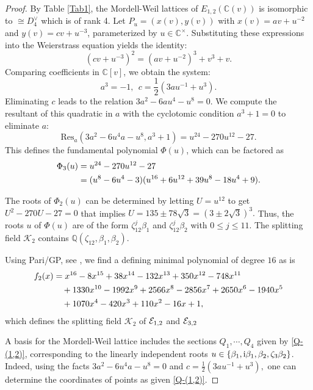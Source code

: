 \documentclass[11pt]{amsart}
\begin{document}
\begin{proof}
By Table \ref{Tab1}, the   Mordell-Weil lattices of  $E_{1,2}(\mathbb{C}(v)) $ is isomorphic to $\cong D_4^\vee$ which is of rank 4.
Let  $P_u = (x(v), y(v))$ with $x(v) = a v + u^{-2}$ and $y(v) = c v + u^{-3}$, parameterized by $u \in \mathbb{C}^\times$. Substituting these expressions into the Weierstrass equation yields the identity:
	\[ (c v + u^{-3})^2 = (a v + u^{-2})^3 + v^3 + v. \]
	Comparing coefficients in $\mathbb{C}[v]$, we obtain the system:
	\begin{equation*}
		a^3  = -1,   \ \ 
		c = \frac{1}{2}(3au^{-1} + u^3).
	\end{equation*}
	Eliminating $c$ leads to the relation $3a^2 - 6au^4 - u^8 = 0$. We compute the resultant of this quadratic in $a$ with the cyclotomic condition $a^3+1=0$ to eliminate $a$:
	\[ \mathrm{Res}_a(3a^2 - 6u^4 a - u^8, a^3+1) = u^{24} - 270u^{12} - 27. \]
	This defines the fundamental polynomial $\Phi(u)$, which can be factored as
	\begin{align}
		\Phi_3(u)  & =u^{24} - 270u^{12} - 27\notag \\
		& = (u^8 - 6u^4 - 3)(u^{16} + 6u^{12} + 39u^8 - 18u^4 + 9).
	\end{align} 
	
	

	The roots of $\Phi_2(u)$ can be determined by letting $U = u^{12}$ to get
	$ U^2 - 270 U - 27 = 0$ that  implies $U = 135 \pm 78\sqrt{3} = (3 \pm 2\sqrt{3})^3. $  Thus, 
	the roots $u$  of $\Phi(u)$ are of the form $\zeta_{12}^j \beta_1 $ and $ \zeta_{12}^j \beta_2  $ with  $0 \leq j \leq 11$.  The splitting field  $\mathcal{K}_2$ contains $ \mathbb{Q}(\zeta_{12}, \beta_1, \beta_2)$.
	
		Using Pari/GP, see \cite[Gp360]{Shioda360-Codes}, we find a defining minimal polynomial of degree $16$ as 
is
	\begin{align}
		f_2(x)	& = x^{16} - 8x^{15} + 38x^{14} - 132x^{13} + 350x^{12} - 748x^{11} \notag \\
		&\quad + 1330x^{10} - 1992x^9 + 2566x^8 - 2856x^7 + 2650x^6 - 1940x^5 \notag \\
		&\quad + 1070x^4 - 420x^3 + 110x^2 - 16x + 1,
		\label{f-(1,2)}
	\end{align} 
	which defines   the splitting field  $\mathcal{K}_2$ of   ${\mathcal E}_{1,2}$ and ${\mathcal E}_{3,2}$
	
 	
	
	A basis for the Mordell-Weil lattice includes the sections $Q_1, \cdots, Q_4$
	  given by   \ref{Q-(1,2)},   corresponding to the linearly independent roots $u \in \{ \beta_1, {\rm{i}} \beta_1, \beta_2, \zeta_3 \beta_2 \}$. Indeed, using the facts 
	   $3a^2 - 6u^4 a - u^8=0$  and  $c = \frac{1}{2}(3au^{-1} + u^3),$ one can determine the coordinates of   points as given  \ref{Q-(1,2)}.
	  

\end{proof}
\end{document}
